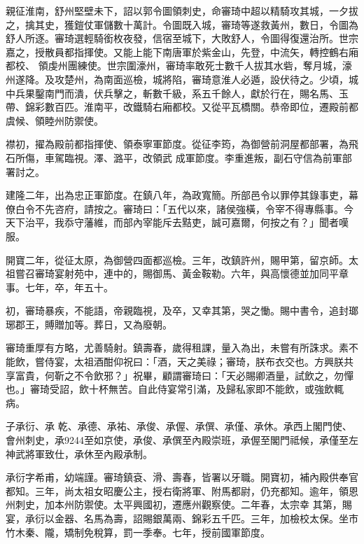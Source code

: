 \begin{pinyinscope}
 親征淮南，舒州堅壁未下，詔以郭令圖領刺史，命審琦中超以精騎攻其城，一夕拔之，擒其史，獲鎧仗軍儲數十萬計。令圖既入城，審琦等遂救黃州，數日，令圖為舒人所逐。審琦選輕騎銜枚夜發，信宿至城下，大敗舒人，令圖得復還治所。世宗嘉之，授散員都指揮使。又能上能下南唐軍於紫金山，先登，中流矢，轉控鶴右廂都校、
 領虔州團練使。世宗圍濠州，審琦率敢死士數千人拔其水砦，奪月城，濠州遂降。及攻楚州，為南面巡檢，城將陷，審琦意淮人必遁，設伏待之。少頃，城中兵果鑿南門而潰，伏兵擊之，斬數千級，系五千餘人，獻於行在，賜名馬、玉帶、錦彩數百匹。淮南平，改鐵騎右廂都校。又從平瓦橋關。恭帝即位，遷殿前都虞候、領睦州防禦使。



 襟初，擢為殿前都指揮使、領泰寧軍節度。從征李筠，為御營前洞屋都部署，為飛石所傷，車駕臨視。澤、潞平，改領武
 成軍節度。李重進叛，副石守信為前軍部署討之。



 建隆二年，出為忠正軍節度。在鎮八年，為政寬簡。所部邑令以罪停其錄事吏，幕僚白令不先咨府，請按之。審琦曰：「五代以來，諸侯強橫，令宰不得專縣事。今天下治平，我忝守藩維，而部內宰能斥去黠吏，誠可嘉爾，何按之有？」聞者嘆服。



 開寶二年，從征太原，為御營四面都巡檢。三年，改鎮許州，賜甲第，留京師。太祖嘗召審琦宴射苑中，連中的，賜御馬、黃金鞍勒。六年，與高懷德並加同平章
 事。七年，卒，年五十。



 初，審琦暴疾，不能語，帝親臨視，及卒，又幸其第，哭之慟。賜中書令，追封瑯琊郡王，賻贈加等。葬日，又為廢朝。



 審琦重厚有方略，尤善騎射。鎮壽春，歲得租課，量入為出，未嘗有所誅求。素不能飲，嘗侍宴，太祖酒酣仰祝曰：「酒，天之美祿；審琦，朕布衣交也。方興朕共享富貴，何靳之不令飲邪？」祝畢，顧謂審琦曰：「天必賜卿酒量，試飲之，勿憚也。」審琦受詔，飲十杯無苦。自此侍宴常引滿，及歸私家即不能飲，或強飲輒病。



 子承衍、承
 乾、承德、承祐、承俊、承偓、承僎、承僅、承休。承西上閣門使、會州刺史，承9244至如京使，承俊、承僎至內殿崇班，承偓至閣門祗候，承僅至左神武將軍致仕，承休至內殿承制。



 承衍字希甫，幼端謹。審琦鎮袞、滑、壽春，皆署以牙職。開寶初，補內殿供奉官都知。三年，尚太祖女昭慶公主，授右衛將軍、附馬都尉，仍充都知。逾年，領恩州刺史，加本州防禦使。太平興國初，遷應州觀察使。二年春，太宗幸
 其第，賜宴，承衍以金器、名馬為壽，詔賜銀萬兩、錦彩五千匹。三年，加檢校太保。坐市竹木秦、隴，矯制免稅算，罰一季奉。七年，授前國軍節度。




\end{pinyinscope}
